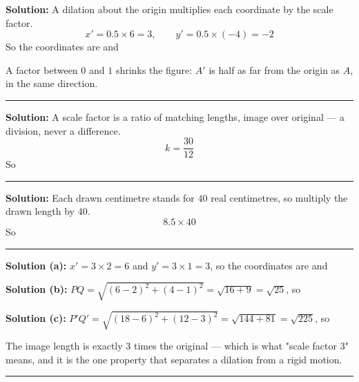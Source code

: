\documentclass[12pt]{article}
\begin{document}




\textbf{Solution:} A dilation about the origin multiplies each coordinate by the scale factor.
\[ x' = 0.5 \times 6 = 3, \qquad y' = 0.5 \times (-4) = -2 \]
So the coordinates are  and 

A factor between $0$ and $1$ shrinks the figure: $A'$ is half as far from the origin as $A$, in the same direction.

\vspace{0.2cm}\noindent\rule{\linewidth}{0.2pt}


\textbf{Solution:} A scale factor is a ratio of matching lengths, image over original --- a division, never a difference.
\[ k = \frac{30}{12} \]
So 

\vspace{0.2cm}\noindent\rule{\linewidth}{0.2pt}


\textbf{Solution:} Each drawn centimetre stands for $40$ real centimetres, so multiply the drawn length by $40$.
\[ 8.5 \times 40 \]
So 

\vspace{0.2cm}\noindent\rule{\linewidth}{0.2pt}


\textbf{Solution (a):} $x' = 3 \times 2 = 6$ and $y' = 3 \times 1 = 3$, so the coordinates are  and 

\textbf{Solution (b):} $PQ = \sqrt{(6-2)^2 + (4-1)^2} = \sqrt{16 + 9} = \sqrt{25}$, so 

\textbf{Solution (c):} $P'Q' = \sqrt{(18-6)^2 + (12-3)^2} = \sqrt{144 + 81} = \sqrt{225}$, so 

The image length is exactly $3$ times the original --- which is what "scale factor $3$" means, and it is the one property that separates a dilation from a rigid motion.

\vspace{0.2cm}\noindent\rule{\linewidth}{0.2pt}
\end{document}
